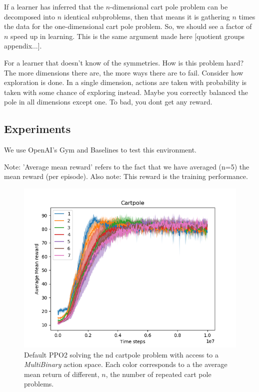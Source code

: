 If a learner has inferred that the $n$-dimensional cart pole problem can be decomposed into $n$ identical subproblems,
then that means it is gathering $n$ times the data for the one-dimensional cart pole problem.
So, we should see a factor of $n$ speed up in learning.
This is the same argument made here [quotient groups appendix...].

For a learner that doesn't know of the symmetries. How is this problem hard?
The more dimensions there are, the more ways there are to fail.
Consider how exploration is done. In a single dimension, actions are taken with probability  is
taken with some chance of exploring instead.
Maybe you correctly balanced the pole in all dimensions except one. To bad, you dont get any reward.

\subsection{Experiments}

We use OpenAI's Gym \cite{Brockman2016} and Baselines \cite{baselines} to test this environment.


Note: 'Average mean reward' refers to the fact that we have averaged (n=5)
the mean reward (per episode). Also note: This reward is the training performance.

\begin{figure}[h!]
  \centering
  \includegraphics[width=1\textwidth,height=0.5\textheight]{../../pictures/figures/multibinary-nd-cart.png}
  \caption{Default PPO2 solving the nd cartpole problem with access to a \textit{MultiBinary} action space. Each color corresponds to a the average mean return of different, $n$, the number of repeated cart pole problems.}
\end{figure}

